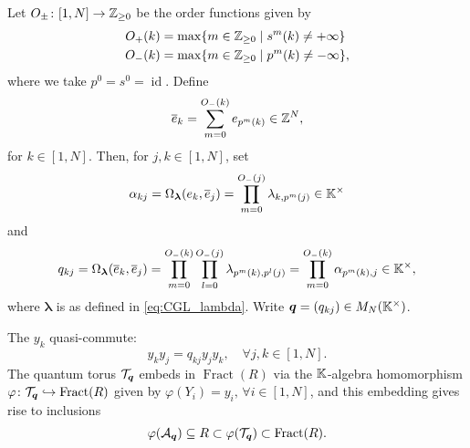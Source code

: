 \documentclass{article}
\newcommand{\blambda}{\boldsymbol{\lambda}}
\DeclareMathOperator{\Fract}{Fract}
\DeclareMathOperator{\id}{id}
\begin{document}
Let $O_{\pm} \colon [1, N] \to \mathbb{Z}_{\geq 0}$ be the order
functions given by
\begin{align*}
	O_{+}(k) & = \max\{m \in \mathbb{Z}_{\geq 0} \mid s^m(k) \neq + \infty\}   \\
	O_{-}(k) & = \max\{m \in \mathbb{Z}_{\geq 0} \mid p^m(k) \neq - \infty\} ,
\end{align*}
%
where we take $p^0 = s^0 = \id$. Define
\begin{equation*}
	\overline{e}_k = \sum_{m=0}^{O_{-}(k)} e_{p^m(k)} \in \mathbb{Z}^N,
\end{equation*}
%
for $k \in [1, N]$. Then, for $j,k \in [1, N]$, set
\begin{equation*}
	\alpha_{kj} = \Omega_{\blambda}(e_k, \overline{e}_j) = \prod_{m=0}^{O_{-}(j)}\lambda_{k, p^m(j)} \in \bbK^\times
\end{equation*}
and
\begin{equation*}
	q_{kj} = \Omega_{\blambda}(\overline{e}_k, \overline{e}_j) = \prod_{m=0}^{O_{-}(k)}\prod_{l=0}^{O_{-}(j)}\lambda_{p^m(k),p^l(j)} = \prod_{m=0}^{O_{-}(k)}\alpha_{p^m (k),j} \in \bbK^\times,
\end{equation*}
%
where $\blambda$ is as defined in \cref{eq:CGL_lambda}. Write $\boldsymbol{q} = (q_{kj}) \in
	M_N(\mathbb{K}^\times)$.
\begin{proposition}
	The $y_k$ quasi-commute:
	\begin{equation}\label{eq:y_quasi_commute}
		y_k y_j = q_{kj}y_jy_k, \quad \forall j, k \in [1, N].
	\end{equation}
	The quantum torus $\mathcal{T}_{\boldsymbol{q}}$ embeds in $\Fract(R)$ via the $\mathbb{K}$-algebra
	homomorphism $\varphi \colon \mcT_{\bmq} \injto \Fract(R)$ given by $\varphi(Y_i) =
		y_i,\,\forall i \in [1, N]$, and this embedding gives rise to inclusions
	\begin{equation*}
		\varphi(\mcA_{\bmq}) \subseteq R \subset \varphi(\mcT_{\bmq}) \subset \Fract(R).
	\end{equation*}
\end{proposition}
\end{document}
